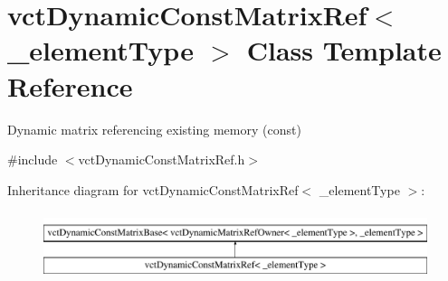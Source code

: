\hypertarget{classvct_dynamic_const_matrix_ref}{\section{vct\-Dynamic\-Const\-Matrix\-Ref$<$ \-\_\-element\-Type $>$ Class Template Reference}
\label{classvct_dynamic_const_matrix_ref}
}


Dynamic matrix referencing existing memory (const)  




{\ttfamily \#include $<$vct\-Dynamic\-Const\-Matrix\-Ref.\-h$>$}

Inheritance diagram for vct\-Dynamic\-Const\-Matrix\-Ref$<$ \-\_\-element\-Type $>$\-:\begin{figure}[H]
\begin{center}
\leavevmode
\includegraphics[height=2.000000cm]{db/da5/classvct_dynamic_const_matrix_ref}
\end{center}
\end{figure}
